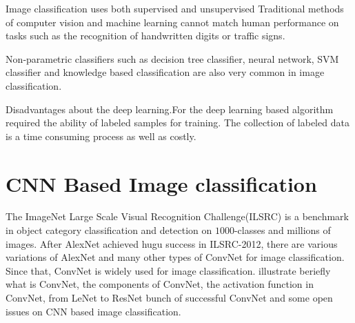 \documentclass[10pt,twocolumn,letterpaper]{article}
\begin{document}
Image classification uses both supervised and unsupervised 
Traditional  methods  of  computer  vision  and  machine
learning cannot match human performance on tasks such
as the recognition of handwritten digits or traffic signs.\cite{ciregancolumn}

Non‐parametric  classifiers  such  as  decision tree   classifier,  neural   network,   SVM   classifier and knowledge based classification are also very common in image classification. 

Disadvantages about the deep learning.For the deep learning based algorithm required the ability of labeled samples for training. The collection of labeled data is a time consuming process as well as costly. 



\section{CNN Based Image classification}

\par
The ImageNet Large Scale Visual Recognition Challenge(ILSRC) is a benchmark in object category classification and detection on $1000$-classes and millions of images. After AlexNet achieved hugu success in ILSRC-2012, there are various variations of AlexNet\cite{krizhevsky2012imagenet} and many other types of ConvNet for image classification. Since that, ConvNet is widely used for image classification. \cite{aloysius2017review} illustrate beriefly what is ConvNet, the components of ConvNet, the activation function in ConvNet, from LeNet to ResNet bunch of successful ConvNet and some open issues on CNN based image classification.
\end{document}
